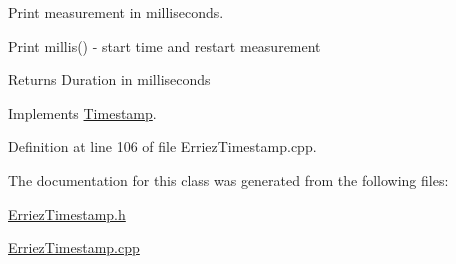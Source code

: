 Print measurement in milliseconds. 

Print millis() -\/ start time and restart measurement \begin{DoxyReturn}{Returns}
Duration in milliseconds 
\end{DoxyReturn}


Implements \hyperlink{class_timestamp_a62b55270dae36ad337c87ae30eeb2fb9}{Timestamp}.



Definition at line 106 of file Erriez\+Timestamp.\+cpp.



The documentation for this class was generated from the following files\+:\begin{DoxyCompactItemize}
\item 
\hyperlink{_erriez_timestamp_8h}{Erriez\+Timestamp.\+h}\item 
\hyperlink{_erriez_timestamp_8cpp}{Erriez\+Timestamp.\+cpp}\end{DoxyCompactItemize}
